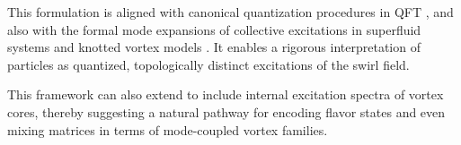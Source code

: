 This formulation is aligned with canonical quantization procedures in QFT \cite{verlinde2021qft}, and also with the formal mode expansions of collective excitations in superfluid systems \cite{pethick2002bose} and knotted vortex models \cite{kleckner2013creation}. It enables a rigorous interpretation of particles as quantized, topologically distinct excitations of the swirl field.

This framework can also extend to include internal excitation spectra of vortex cores, thereby suggesting a natural pathway for encoding flavor states and even mixing matrices in terms of mode-coupled vortex families.